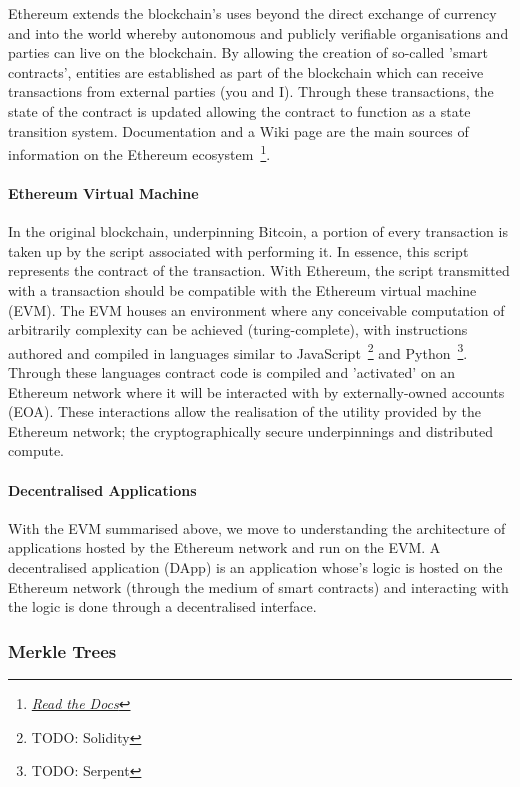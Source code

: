 Ethereum extends the blockchain's uses beyond the direct exchange of currency and into the world whereby autonomous and publicly verifiable organisations and parties can live on the blockchain. By allowing the creation of so-called 'smart contracts', entities are established as part of the blockchain which can receive transactions from external parties (you and I). Through these transactions, the state of the contract is updated allowing the contract to function as a state transition system. Documentation and a Wiki page are the main sources of information on the Ethereum ecosystem~\footnote{\href{http://ethdocs.org/en/latest}{\textit{Read the Docs}}}.

\paragraph{Ethereum Virtual Machine}

In the original blockchain, underpinning Bitcoin, a portion of every transaction is taken up by the script associated with performing it. In essence, this script represents the contract of the transaction. With Ethereum, the script transmitted with a transaction should be compatible with the Ethereum virtual machine (EVM). The EVM houses an environment where any conceivable computation of arbitrarily complexity can be achieved (turing-complete), with instructions authored and compiled in languages similar to JavaScript~\footnote{TODO: Solidity} and Python~\footnote{TODO: Serpent}. Through these languages contract code is compiled and 'activated' on an Ethereum network where it will be interacted with by externally-owned accounts (EOA). These interactions allow the realisation of the utility provided by the Ethereum network; the cryptographically secure underpinnings and distributed compute.

\paragraph{Decentralised Applications}

With the EVM summarised above, we move to understanding the architecture of applications hosted by the Ethereum network and run on the EVM. A decentralised application (DApp) is an application whose's logic is hosted on the Ethereum network (through the medium of smart contracts) and interacting with the logic is done through a decentralised interface.

\subsubsection{Merkle Trees}

